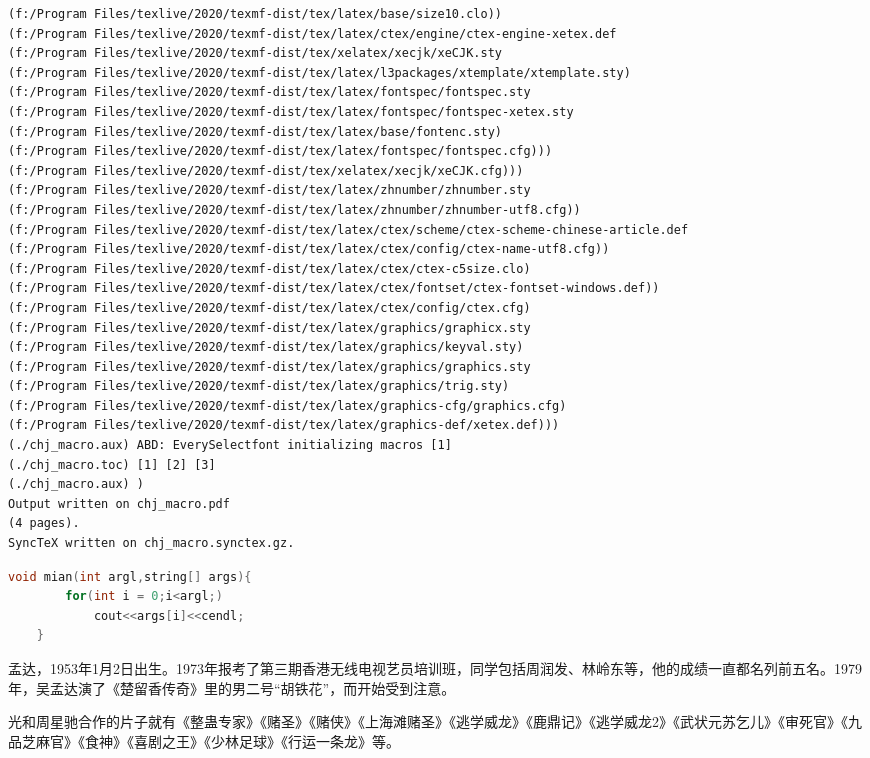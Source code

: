 \documentclass[UTF8]{ctexart}
\begin{document}
\begin{lstlisting}[language=xml]
(f:/Program Files/texlive/2020/texmf-dist/tex/latex/base/size10.clo))
(f:/Program Files/texlive/2020/texmf-dist/tex/latex/ctex/engine/ctex-engine-xetex.def
(f:/Program Files/texlive/2020/texmf-dist/tex/xelatex/xecjk/xeCJK.sty
(f:/Program Files/texlive/2020/texmf-dist/tex/latex/l3packages/xtemplate/xtemplate.sty)
(f:/Program Files/texlive/2020/texmf-dist/tex/latex/fontspec/fontspec.sty
(f:/Program Files/texlive/2020/texmf-dist/tex/latex/fontspec/fontspec-xetex.sty
(f:/Program Files/texlive/2020/texmf-dist/tex/latex/base/fontenc.sty)
(f:/Program Files/texlive/2020/texmf-dist/tex/latex/fontspec/fontspec.cfg)))
(f:/Program Files/texlive/2020/texmf-dist/tex/xelatex/xecjk/xeCJK.cfg)))
(f:/Program Files/texlive/2020/texmf-dist/tex/latex/zhnumber/zhnumber.sty
(f:/Program Files/texlive/2020/texmf-dist/tex/latex/zhnumber/zhnumber-utf8.cfg))
(f:/Program Files/texlive/2020/texmf-dist/tex/latex/ctex/scheme/ctex-scheme-chinese-article.def
(f:/Program Files/texlive/2020/texmf-dist/tex/latex/ctex/config/ctex-name-utf8.cfg))
(f:/Program Files/texlive/2020/texmf-dist/tex/latex/ctex/ctex-c5size.clo)
(f:/Program Files/texlive/2020/texmf-dist/tex/latex/ctex/fontset/ctex-fontset-windows.def))
(f:/Program Files/texlive/2020/texmf-dist/tex/latex/ctex/config/ctex.cfg)
(f:/Program Files/texlive/2020/texmf-dist/tex/latex/graphics/graphicx.sty
(f:/Program Files/texlive/2020/texmf-dist/tex/latex/graphics/keyval.sty)
(f:/Program Files/texlive/2020/texmf-dist/tex/latex/graphics/graphics.sty
(f:/Program Files/texlive/2020/texmf-dist/tex/latex/graphics/trig.sty)
(f:/Program Files/texlive/2020/texmf-dist/tex/latex/graphics-cfg/graphics.cfg)
(f:/Program Files/texlive/2020/texmf-dist/tex/latex/graphics-def/xetex.def)))
(./chj_macro.aux) ABD: EverySelectfont initializing macros [1]
(./chj_macro.toc) [1] [2] [3]
(./chj_macro.aux) )
Output written on chj_macro.pdf
(4 pages).
SyncTeX written on chj_macro.synctex.gz.

\end{lstlisting}


\begin{lstlisting}[language=c]
    void mian(int argl,string[] args){
        for(int i = 0;i<argl;)
            cout<<args[i]<<cendl;
    }
\end{lstlisting}



\begin{multicols}{2}  %
    孟达，1953年1月2日出生。1973年报考了第三期香港无线电视艺员培训班，同学包括周润发、林岭东等，他的成绩一直都名列前五名。1979年，吴孟达演了《楚留香传奇》里的男二号“胡铁花”，而开始受到注意。
\end{multicols}
\begin{multicols}{2}

    光和周星驰合作的片子就有《整蛊专家》《赌圣》《赌侠》《上海滩赌圣》《逃学威龙》《鹿鼎记》《逃学威龙2》《武状元苏乞儿》《审死官》《九品芝麻官》《食神》《喜剧之王》《少林足球》《行运一条龙》等。
\end{multicols}
\end{document}
